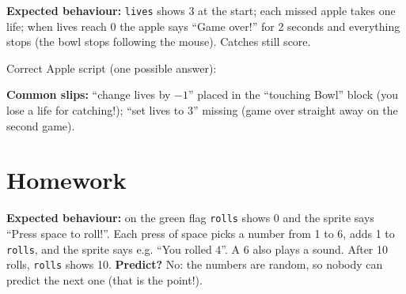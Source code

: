\begin{answer}
\textbf{Expected behaviour:} \texttt{lives} shows 3 at the start; each missed apple takes one life; when lives reach 0 the apple says \enquote{Game over!} for 2 seconds and everything stops (the bowl stops following the mouse). Catches still score.

Correct Apple script (one possible answer):
\begin{center}
\begin{scratch}[scale=0.72]
\end{scratch}
\end{center}
\textbf{Common slips:} \enquote{change lives by $-1$} placed in the \enquote{touching Bowl} block (you lose a life for catching!); \enquote{set lives to 3} missing (game over straight away on the second game).
\end{answer}

\section{Homework}
\begin{answer}
\textbf{Expected behaviour:} on the green flag \texttt{rolls} shows 0 and the sprite says \enquote{Press space to roll!}. Each press of space picks a number from 1 to 6, adds 1 to \texttt{rolls}, and the sprite says e.g. \enquote{You rolled 4}. A 6 also plays a sound. After 10 rolls, \texttt{rolls} shows 10.
\textbf{Predict?} No: the numbers are random, so nobody can predict the next one (that is the point!).
\end{answer}


